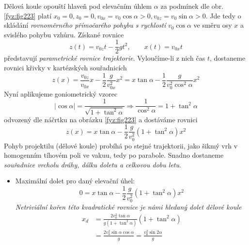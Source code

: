 \begin{example}
  Dělová koule opouští hlaveň pod elevačním úhlem $\alpha$ za podmínek dle obr. 
  \ref{fyz:fig223} platí $x_0=0, z_0=0, v_{0x}=v_0\cos\alpha>0, v_{0z}=v_0\sin\alpha>0$. Jde 
  tedy o skládání \emph{rovnoměrného přímočarého pohybu s rychlostí} $v_0\cos\alpha$ ve směru osy 
  $x$ a svislého pohybu vzhůru. Získané rovnice
  \begin{equation}\label{mech:eq_delo_rce_pohybu}
    z(t)=v_{0z}t-\frac{1}{2}gt^2, \qquad x(t)=v_{0x}t
  \end{equation}
  představují \emph{parametrické rovnice trajektorie}. Vyloučíme-li z nich čas $t$, dostaneme 
  rovnici křivky v kartézských souřadnicích
  \begin{equation}\label{mech:eq_delo_vakuum_param_rce}
    z(x)=  \frac{v_{0z}}{v_{0x}}x-\frac{1}{2}\frac{g}{v_{0x}^2}x^2
        = x\tan\alpha-\frac{1}{2}\frac{g}{v_0^2\cos^2\alpha}x^2
  \end{equation}
  Nyní aplikujeme goniometrický vzorec
  \begin{equation*}
    \vert\cos\alpha\rvert = \frac{1}{\sqrt{1+\tan^2\alpha}}\Rightarrow \frac{1}{\cos^2\alpha} 
                          = 1+\tan^2\alpha
  \end{equation*}
  odvozený dle náčrtku na obrázku \ref{fyz:fig223} a dostáváme rovnici
  \begin{equation}\label{mech_eq_example_vysledna_rce}
    z(x)=x\tan\alpha-\frac{1}{2}\frac{g}{v_0^2}(1+\tan^2\alpha)x^2
  \end{equation}
  Pohyb projektilu (dělové koule) probíhá po stejné trajektorii, jako šikmý vrh v homogenním 
  tíhovém poli ve vakuu, tedy po parabole. Snadno dostaneme \emph{souřadnice vrcholu dráhy, dálku 
  doletu a celkovou dobu letu}.

  \begin{itemize}
    \item Maximální dolet pro daný elevační úhel:
      \begin{equation}\label{mech:eq_elevacni_uhel_1}
        0=x\tan\alpha-\frac{1}{2}\frac{g}{v_0^2}(1+\tan^2\alpha)x^2
      \end{equation}
      \emph{Netriviální kořen této kvadratické rovnice je námi hledaný dolet dělové koule}
      \begin{align}  %
        x_d &=\frac{2v_0^2\tan\alpha}{g(1+\tan^2\alpha)}(1+\tan^2\alpha)        \nonumber \\
            &=\frac{2v_0^2\sin\alpha\cos\alpha}{g}=\frac{v_0^2\sin{2\alpha}}{g} \label{fyz:eq235}
      \end{align}


\end{itemize}
\end{example}
